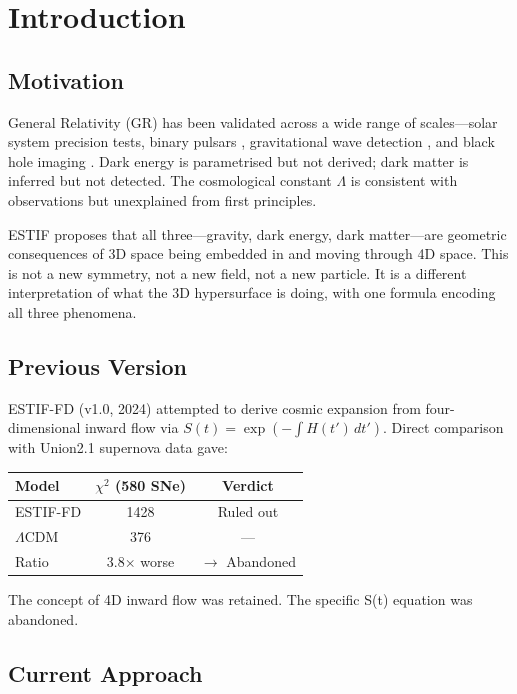 \documentclass[12pt]{article}
\begin{document}
\section{Introduction}

\subsection{Motivation}

General Relativity (GR) has been validated across a wide range of scales---solar system
precision tests, binary pulsars \cite{Will2014}, gravitational wave detection
\cite{Abbott2016}, and black hole imaging \cite{EHT2019}. Dark energy is parametrised
but not derived; dark matter is inferred but not detected. The cosmological constant
$\Lambda$ is consistent with observations but unexplained from first principles.

ESTIF proposes that all three---gravity, dark energy, dark matter---are geometric
consequences of 3D space being embedded in and moving through 4D space. This is
not a new symmetry, not a new field, not a new particle. It is a different interpretation
of what the 3D hypersurface is doing, with one formula encoding all three phenomena.

\subsection{Previous Version}

ESTIF-FD (v1.0, 2024) attempted to derive cosmic expansion from four-dimensional
inward flow via $S(t) = \exp(-\int H(t')\,dt')$. Direct comparison with Union2.1
supernova data gave:

\begin{center}
\begin{tabular}{lcc}
\toprule
Model & $\chi^2$ (580 SNe) & Verdict \\
\midrule
ESTIF-FD & 1428 & Ruled out \\
$\Lambda$CDM & 376 & --- \\
Ratio & 3.8$\times$ worse & $\longrightarrow$ Abandoned \\
\bottomrule
\end{tabular}
\end{center}

The concept of 4D inward flow was retained. The specific S(t) equation was abandoned.

\subsection{Current Approach}
\end{document}
